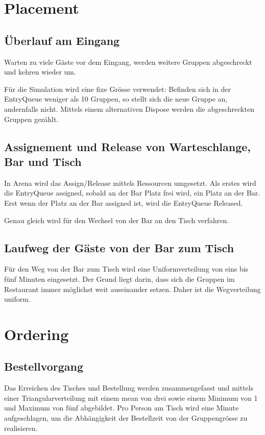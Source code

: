\documentclass[ngerman,a4paper,12pt]{scrreprt}
\begin{document}
	
	\section{Placement}		
		\subsection{Überlauf am Eingang}
			Warten zu viele Gäste vor dem Eingang, werden weitere Gruppen abgeschreckt und kehren wieder um.
		
			Für die Simulation wird eine fixe Grösse verwendet: 			Befinden sich in der EntryQueue weniger als 10 Gruppen, so stellt sich die neue Gruppe an, andernfalls nicht. Mittels einem alternativen Dispose werden die abgeschreckten Gruppen gezählt.
			
			
		\subsection{Assignement und Release von Warteschlange, Bar und Tisch}
			In Arena wird das Assign/Release mittels Ressourcen umgesetzt. Als erstes wird die EntryQueue assigned, sobald an der Bar Platz frei wird, ein Platz an der Bar. Erst wenn der Platz an der Bar assigned ist, wird die EntryQueue Released. 
		
		Genau gleich wird für den Wechsel von der Bar an den Tisch verfahren.
	
	
		\subsection{Laufweg der Gäste von der Bar zum Tisch}
			Für den Weg von der Bar zum Tisch wird eine Uniformverteilung von eins bis fünf Minuten eingesetzt. Der Grund liegt darin, dass sich die Gruppen im Restaurant immer möglichst weit auseinander setzen. Daher ist die Wegverteilung uniform.
	
	
	\section{Ordering}			
		\subsection{Bestellvorgang}
			Das Erreichen des Tisches und Bestellung werden zusammengefasst und mittels einer Triangularverteilung mit einem mean von drei sowie einem Minimum von 1 und Maximum von fünf abgebildet. Pro Person am Tisch wird eine Minute aufgeschlagen, um die Abhängigkeit der Bestellzeit von der Gruppengrösse zu realisieren.
	
\end{document}
